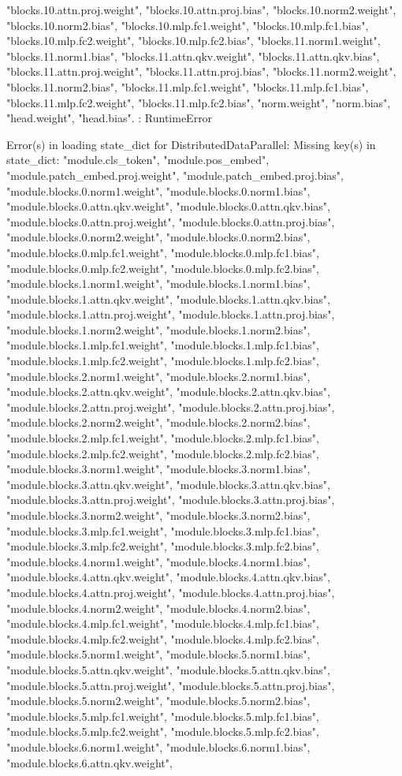 "blocks.10.attn.proj.weight", "blocks.10.attn.proj.bias", "blocks.10.norm2.weight", "blocks.10.norm2.bias", "blocks.10.mlp.fc1.weight", "blocks.10.mlp.fc1.bias", "blocks.10.mlp.fc2.weight", "blocks.10.mlp.fc2.bias", "blocks.11.norm1.weight", "blocks.11.norm1.bias", "blocks.11.attn.qkv.weight", "blocks.11.attn.qkv.bias", "blocks.11.attn.proj.weight", "blocks.11.attn.proj.bias", "blocks.11.norm2.weight", "blocks.11.norm2.bias", "blocks.11.mlp.fc1.weight", "blocks.11.mlp.fc1.bias", "blocks.11.mlp.fc2.weight", "blocks.11.mlp.fc2.bias", "norm.weight", "norm.bias", "head.weight", "head.bias". 
: RuntimeError

Error(s) in loading state_dict for DistributedDataParallel:
	Missing key(s) in state_dict: "module.cls_token", "module.pos_embed", "module.patch_embed.proj.weight", "module.patch_embed.proj.bias", "module.blocks.0.norm1.weight", "module.blocks.0.norm1.bias", "module.blocks.0.attn.qkv.weight", "module.blocks.0.attn.qkv.bias", "module.blocks.0.attn.proj.weight", "module.blocks.0.attn.proj.bias", "module.blocks.0.norm2.weight", "module.blocks.0.norm2.bias", "module.blocks.0.mlp.fc1.weight", "module.blocks.0.mlp.fc1.bias", "module.blocks.0.mlp.fc2.weight", "module.blocks.0.mlp.fc2.bias", "module.blocks.1.norm1.weight", "module.blocks.1.norm1.bias", "module.blocks.1.attn.qkv.weight", "module.blocks.1.attn.qkv.bias", "module.blocks.1.attn.proj.weight", "module.blocks.1.attn.proj.bias", "module.blocks.1.norm2.weight", "module.blocks.1.norm2.bias", "module.blocks.1.mlp.fc1.weight", "module.blocks.1.mlp.fc1.bias", "module.blocks.1.mlp.fc2.weight", "module.blocks.1.mlp.fc2.bias", "module.blocks.2.norm1.weight", "module.blocks.2.norm1.bias", "module.blocks.2.attn.qkv.weight", "module.blocks.2.attn.qkv.bias", "module.blocks.2.attn.proj.weight", "module.blocks.2.attn.proj.bias", "module.blocks.2.norm2.weight", "module.blocks.2.norm2.bias", "module.blocks.2.mlp.fc1.weight", "module.blocks.2.mlp.fc1.bias", "module.blocks.2.mlp.fc2.weight", "module.blocks.2.mlp.fc2.bias", "module.blocks.3.norm1.weight", "module.blocks.3.norm1.bias", "module.blocks.3.attn.qkv.weight", "module.blocks.3.attn.qkv.bias", "module.blocks.3.attn.proj.weight", "module.blocks.3.attn.proj.bias", "module.blocks.3.norm2.weight", "module.blocks.3.norm2.bias", "module.blocks.3.mlp.fc1.weight", "module.blocks.3.mlp.fc1.bias", "module.blocks.3.mlp.fc2.weight", "module.blocks.3.mlp.fc2.bias", "module.blocks.4.norm1.weight", "module.blocks.4.norm1.bias", "module.blocks.4.attn.qkv.weight", "module.blocks.4.attn.qkv.bias", "module.blocks.4.attn.proj.weight", "module.blocks.4.attn.proj.bias", "module.blocks.4.norm2.weight", "module.blocks.4.norm2.bias", "module.blocks.4.mlp.fc1.weight", "module.blocks.4.mlp.fc1.bias", "module.blocks.4.mlp.fc2.weight", "module.blocks.4.mlp.fc2.bias", "module.blocks.5.norm1.weight", "module.blocks.5.norm1.bias", "module.blocks.5.attn.qkv.weight", "module.blocks.5.attn.qkv.bias", "module.blocks.5.attn.proj.weight", "module.blocks.5.attn.proj.bias", "module.blocks.5.norm2.weight", "module.blocks.5.norm2.bias", "module.blocks.5.mlp.fc1.weight", "module.blocks.5.mlp.fc1.bias", "module.blocks.5.mlp.fc2.weight", "module.blocks.5.mlp.fc2.bias", "module.blocks.6.norm1.weight", "module.blocks.6.norm1.bias", "module.blocks.6.attn.qkv.weight", 